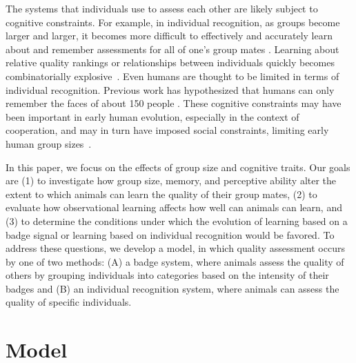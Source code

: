 The systems that individuals use to assess each other are likely subject to cognitive constraints. For example, in individual recognition, as groups become larger and larger, it becomes more difficult to effectively and accurately learn about and remember assessments for all of one's group mates \citep{Rohwer:1982fk,Solberg:1997uq}. Learning about relative quality rankings or relationships between individuals quickly becomes combinatorially explosive~\citep{Seyfarth2015SocialCognition}. Even humans are thought to be limited in terms of individual recognition. Previous work has hypothesized that humans can only remember the faces of about 150 people \citep{Dunbar:1993zr,Hill:2003ly}. These cognitive constraints may have been important in early human evolution, especially in the context of cooperation, and may in turn have imposed social constraints, limiting early human group sizes~\citep{Dunbar:1992ys,Dunbar:1993zr}.


In this paper, we focus on the effects of group size and cognitive traits. Our goals are (1) to investigate how group size, memory, and perceptive ability alter the extent to which animals can learn the quality of their group mates, (2) to evaluate how observational learning affects how well can animals can learn, and (3) to determine the conditions under which the evolution of learning based on a badge signal or learning based on individual recognition would be favored. To address these questions, we develop a model, in which quality assessment occurs by one of two methods: (A) a badge system, where animals assess the quality of others by grouping individuals into categories based on the intensity of their badges and (B) an individual recognition system, where animals can assess the quality of specific individuals.  


\section*{Model} 

